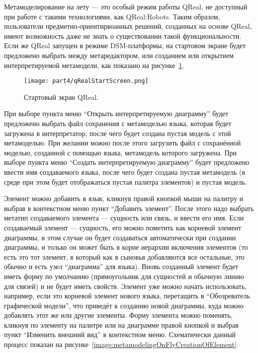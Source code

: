 Метамоделирование на лету --- это особый режим работы QReal, не доступный при работе 
с такими технологиями, как QReal:Robots. Таким образом, пользователи предметно-ориентирвоанных 
решений, созданных на основе QReal, имеют возможность даже не знать о существовании 
такой функциональности. Если же QReal запущен в режиме DSM-платформы, на стартовом 
экране будет предложено выбрать между метаредактором, или созданием или открытием 
интерпретируемой метамодели, как показано на рисунке~\ref{image:qRealStartScreen}.

\begin{figure} [ht]
	\begin{center}
		\texttt{[image: part4/qRealStartScreen.png]}
		\caption{Стартовый экран QReal.}
		\label{image:qRealStartScreen}
	\end{center}
\end{figure}

При выборе пункта меню "`Открыть интерпретируемую диаграмму"' будет предложено выбрать 
файл сохранения с метамоделью языка, которая будет загружена в интерпретатор, после 
чего будет создана пустая модель с этой метамоделью. При желании можно после этого 
загрузить файл с сохранённой моделью, созданной с помощью языка, метамодель которого 
загружена. При выборе пункта меню "`Создать интерпретируемую диаграмму"' будет предложено 
ввести имя создаваемого языка, после чего будет создана пустая метамодель (в среде 
при этом будет отображаться пустая палитра элементов) и пустая модель.

Элемент можно добавить в язык, кликнув правой кнопкой мыши на палитру и выбрав в контекстном 
меню пункт "`Добавить элемент"'. После этого надо выбрать метатип создаваемого элемента 
--- сущность или связь, и ввести его имя. Если создаваемый элемент --- сущность, его
можно пометить как корневой элемент диаграммы, в этом случае он будет создаваться 
автоматически при создании диаграммы, и только он может быть в корне иерархии включения 
элементов (то есть это тот элемент, в который как в сыновья добавляются все остальные, 
это обычно и есть узел "`диаграмма"' для языка). Вновь созданный элемент будет иметь 
форму по умолчанию (прямоугольник для сущностей и обычную линию для связей) и не будет 
иметь свойств. Элемент уже можно начать использовать, например, если это корневой 
элемент нового языка, перетащить в "`Обозреватель графической модели"', что приведёт 
к созданию новой диаграммы, куда можно добавлять этот же или другие элементы. Форму 
элемента можно поменять, кликнув по элементу на палитре или на диаграмме правой кнопкой 
и выбрав пункт "`Изменить внешний вид"' в контекстном меню. Схематически данный процесс 
показан на рисунке~\ref{image:metamodelingOnFlyCreationOfElement}.

